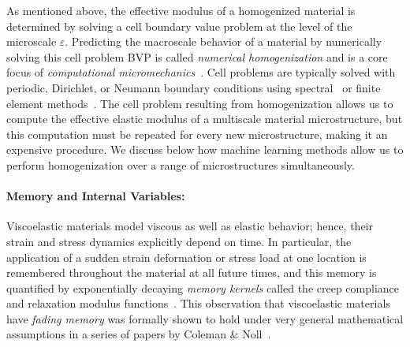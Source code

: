 \documentclass[letterpaper,11pt]{article}
\begin{document}
As mentioned above, the effective modulus of a homogenized material is determined by solving a cell boundary value problem at the level of the microscale $\varepsilon$. Predicting the macroscale behavior of a material by numerically solving this cell problem BVP is called \textit{numerical homogenization} and is a core focus of \textit{computational micromechanics}~\cite{zohdi2008introduction}. Cell problems are typically solved with periodic, Dirichlet, or Neumann boundary conditions using spectral~\cite{mishra2016comparative, moulinec1998numerical} or finite element methods~\cite{guedes1990preprocessing, suquet1987elements}. The cell problem resulting from homogenization allows us to compute the effective elastic modulus of a multiscale material microstructure, but this computation must be repeated for every new microstructure, making it an expensive procedure. We discuss below how machine learning methods allow us to perform homogenization over a range of microstructures simultaneously.~\\

\paragraph{Memory and Internal Variables:}
Viscoelastic materials model viscous as well as elastic behavior; hence, their strain and stress dynamics explicitly depend on time. In particular, the application of a sudden strain deformation or stress load at one location is remembered throughout the material at all future times, and this memory is quantified by exponentially decaying \textit{memory kernels} called the creep compliance and relaxation modulus functions~\cite{ferry1980viscoelastic, tschoegl2012phenomenological}. This observation that viscoelastic materials have \textit{fading memory} was formally shown to hold under very general mathematical assumptions in a series of papers by Coleman \& Noll~\cite{coleman1961foundations, coleman1961recent}.
\end{document}
